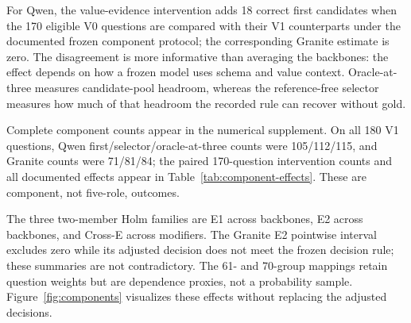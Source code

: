 \documentclass[applsci,article,submit,moreauthors]{Definitions/mdpi}
\begin{document}
For Qwen, the value-evidence intervention adds 18 correct first candidates when the 170 eligible V0 questions are compared with their V1 counterparts under the documented frozen component protocol; the corresponding Granite estimate is zero. The disagreement is more informative than averaging the backbones: the effect depends on how a frozen model uses schema and value context. Oracle-at-three measures candidate-pool headroom, whereas the reference-free selector measures how much of that headroom the recorded rule can recover without gold.

Complete component counts appear in the numerical supplement. On all 180 V1 questions, Qwen first/selector/oracle-at-three counts were 105/112/115, and Granite counts were 71/81/84; the paired 170-question intervention counts and all documented effects appear in Table~\ref{tab:component-effects}. These are component, not five-role, outcomes.

\begin{table}[htbp]
\caption{Complete component-effect families. Intervals are pointwise group-composition sensitivity summaries, not simultaneous intervals and not inversions of the Holm tests. Each family contains the two displayed members indicated by its identifier.}
\label{tab:component-effects}\centering\scriptsize
{}
\end{table}

The three two-member Holm families are E1 across backbones, E2 across backbones, and Cross-E across modifiers. The Granite E2 pointwise interval excludes zero while its adjusted decision does not meet the frozen decision rule; these summaries are not contradictory. The 61- and 70-group mappings retain question weights but are dependence proxies, not a probability sample. Figure~\ref{fig:components} visualizes these effects without replacing the adjusted decisions.
\end{document}
